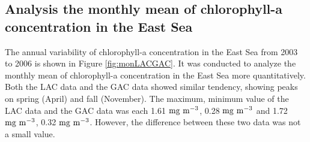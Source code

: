 
\subsection{Analysis the monthly mean of chlorophyll-a concentration in the East Sea}


The annual variability of chlorophyll-a concentration in the East Sea from 2003 to 2006 is shown in Figure \ref{fig:monLACGAC}. It was conducted to analyze the monthly mean of chlorophyll-a concentration in the East Sea more quantitatively. Both the LAC data and the GAC data showed similar tendency, showing peaks on spring (April) and fall (November). The maximum, minimum value of the LAC data and the GAC data was each 1.61 $\rm mg~m^{-3}$, 0.28 $\rm mg~m^{-3}$ and 1.72 $\rm mg~m^{-3}$, 0.32 $\rm mg~m^{-3}$.  However, the difference between these two data was not a small value.



